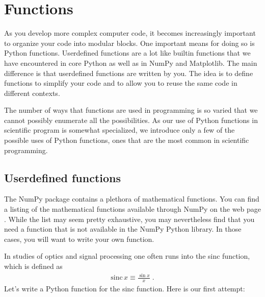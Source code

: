 \documentclass[letterpaper,10pt,english]{sphinxmanual}
\begin{document}
\sphinxstepscope


\chapter{Functions}
\label{\detokenize{chap7/chap7_funcs:functions}}\label{\detokenize{chap7/chap7_funcs:chap7}}\label{\detokenize{chap7/chap7_funcs::doc}}
\sphinxAtStartPar
As you develop more complex computer code, it becomes increasingly important to organize your code into modular blocks.  One important means for doing so is   Python functions.  User\sphinxhyphen{}defined functions are a lot like built\sphinxhyphen{}in functions that we have encountered in core Python as well as in NumPy and Matplotlib.  The main difference is that user\sphinxhyphen{}defined functions are written by you.  The idea is to define functions to simplify your code and to allow you to reuse the same code in different contexts.

\sphinxAtStartPar
The number of ways that functions are used in programming is so varied that we cannot possibly enumerate all the possibilities.  As our use of Python functions in scientific program is somewhat specialized, we introduce only a few of the possible uses of Python functions, ones that are the most common in scientific programming.

\ignorespaces 

\section{User\sphinxhyphen{}defined functions}
\label{\detokenize{chap7/chap7_funcs:user-defined-functions}}\label{\detokenize{chap7/chap7_funcs:userdefdfuncs}}\label{\detokenize{chap7/chap7_funcs:index-0}}
\sphinxAtStartPar
The NumPy package contains a plethora of mathematical functions.  You can find a listing of the mathematical functions available through NumPy on the web page .  While the list may seem pretty exhaustive, you may nevertheless find that you need a function that is not available in the NumPy Python library.  In those cases, you will want to write your own function.

\sphinxAtStartPar
In studies of optics and signal processing one often runs into the sinc function, which is defined as
\begin{equation*}
\begin{split}\mathrm{sinc}\,x \equiv \frac{\sin x}{x} \;.\end{split}
\end{equation*}
\sphinxAtStartPar
Let’s write a Python function for the sinc function.  Here is our first attempt:
\end{document}
